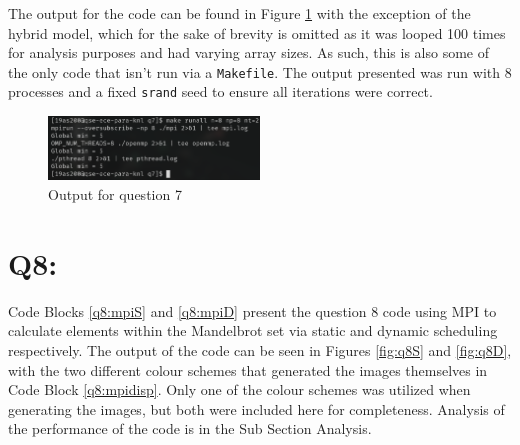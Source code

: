 \documentclass[11pt]{article}
\begin{document}
The output for the code can be found in Figure \ref{fig:q7} with the exception of the hybrid model, which for the sake of brevity is omitted as it was looped 100 times for analysis purposes and had varying array sizes.
As such, this is also some of the only code that isn't run via a \texttt{Makefile}.
The output presented was run with 8 processes and a fixed \texttt{srand} seed to ensure all iterations were correct.
\begin{figure}[H]
\centering
    \includegraphics[width=0.5\textwidth]{./images/q7.png}
\caption{Output for question 7}
\label{fig:q7}
\end{figure}

\newpage
\section*{Q8:}

Code Blocks \ref{q8:mpiS} and \ref{q8:mpiD} present the question 8 code using MPI to calculate elements within the Mandelbrot set via static and dynamic scheduling respectively.
The output of the code can be seen in Figures \ref{fig:q8S} and \ref{fig:q8D}, with the two different colour schemes that generated the images themselves in Code Block \ref{q8:mpidisp}.
Only one of the colour schemes was utilized when generating the images, but both were included here for completeness.
Analysis of the performance of the code is in the Sub Section Analysis.



\end{document}
